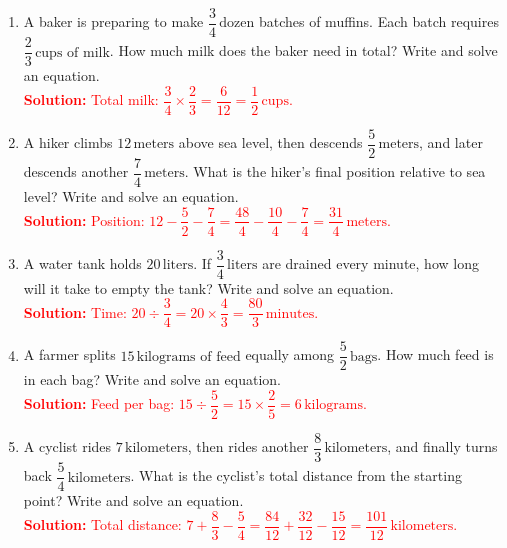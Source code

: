 \documentclass[11pt]{article}
\begin{document}
\begin{tcolorbox}[colframe=black!60, colback=white, 
coltitle=black, colbacktitle=black!15, fonttitle=\bfseries\Large, 
title=Problems, halign title=center, left=10pt, right=10pt, top=10pt, bottom=70pt]
\begin{enumerate}[itemsep=2.5em]
    \item A baker is preparing to make \( \dfrac{3}{4} \, \text{dozen} \) batches of muffins. Each batch requires \( \dfrac{2}{3} \, \text{cups of milk} \). How much milk does the baker need in total? Write and solve an equation.\\
    \textcolor{red}{\textbf{Solution:} Total milk: \( \dfrac{3}{4} \times \dfrac{2}{3} = \dfrac{6}{12} = \dfrac{1}{2} \, \text{cups.} \)}

    \item A hiker climbs \( 12 \, \text{meters} \) above sea level, then descends \( \dfrac{5}{2} \, \text{meters} \), and later descends another \( \dfrac{7}{4} \, \text{meters} \). What is the hiker’s final position relative to sea level? Write and solve an equation.\\
    \textcolor{red}{\textbf{Solution:} Position: \( 12 - \dfrac{5}{2} - \dfrac{7}{4} = \dfrac{48}{4} - \dfrac{10}{4} - \dfrac{7}{4} = \dfrac{31}{4} \, \text{meters.} \)}

    \item A water tank holds \( 20 \, \text{liters} \). If \( \dfrac{3}{4} \, \text{liters} \) are drained every minute, how long will it take to empty the tank? Write and solve an equation.\\
    \textcolor{red}{\textbf{Solution:} Time: \( 20 \div \dfrac{3}{4} = 20 \times \dfrac{4}{3} = \dfrac{80}{3} \, \text{minutes.} \)}

    \item A farmer splits \( 15 \, \text{kilograms of feed} \) equally among \( \dfrac{5}{2} \, \text{bags} \). How much feed is in each bag? Write and solve an equation.\\
    \textcolor{red}{\textbf{Solution:} Feed per bag: \( 15 \div \dfrac{5}{2} = 15 \times \dfrac{2}{5} = 6 \, \text{kilograms.} \)}

    \item A cyclist rides \( 7 \, \text{kilometers} \), then rides another \( \dfrac{8}{3} \, \text{kilometers} \), and finally turns back \( \dfrac{5}{4} \, \text{kilometers} \). What is the cyclist’s total distance from the starting point? Write and solve an equation.\\
    \textcolor{red}{\textbf{Solution:} Total distance: \( 7 + \dfrac{8}{3} - \dfrac{5}{4} = \dfrac{84}{12} + \dfrac{32}{12} - \dfrac{15}{12} = \dfrac{101}{12} \, \text{kilometers.} \)}
\end{enumerate}
\end{tcolorbox}
\end{document}
